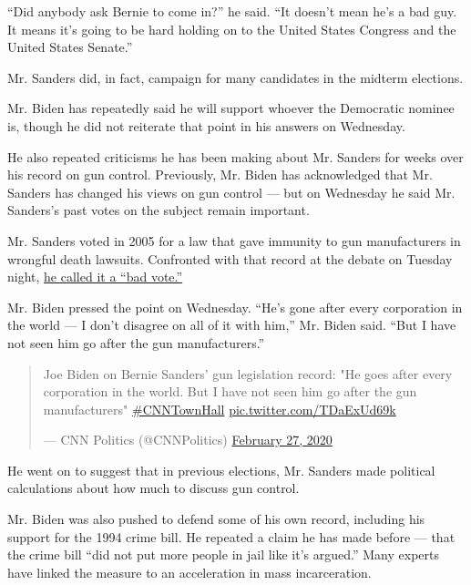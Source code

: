 ``Did anybody ask Bernie to come in?'' he said. ``It doesn't mean he's a
bad guy. It means it's going to be hard holding on to the United States
Congress and the United States Senate.''

Mr. Sanders did, in fact, campaign for many candidates in the midterm
elections.

Mr. Biden has repeatedly said he will support whoever the Democratic
nominee is, though he did not reiterate that point in his answers on
Wednesday.

He also repeated criticisms he has been making about Mr. Sanders for
weeks over his record on gun control. Previously, Mr. Biden has
acknowledged that Mr. Sanders has changed his views on gun control ---
but on Wednesday he said Mr. Sanders's past votes on the subject remain
important.

Mr. Sanders voted in 2005 for a law that gave immunity to gun
manufacturers in wrongful death lawsuits. Confronted with that record at
the debate on Tuesday night,
\href{https://www.nytimes3xbfgragh.onion/2020/02/25/us/politics/bernie-sanders-brady-bill-guns.html}{he
called it a ``bad vote.''}

Mr. Biden pressed the point on Wednesday. ``He's gone after every
corporation in the world --- I don't disagree on all of it with him,''
Mr. Biden said. ``But I have not seen him go after the gun
manufacturers.''

\begin{quote}
Joe Biden on Bernie Sanders' gun legislation record: "He goes after
every corporation in the world. But I have not seen him go after the gun
manufacturers"
\href{https://twitter.com/hashtag/CNNTownHall?src=hash\&ref_src=twsrc\%5Etfw}{\#CNNTownHall}
\href{https://t.co/TDaExUd69k}{pic.twitter.com/TDaExUd69k}

--- CNN Politics (@CNNPolitics)
\href{https://twitter.com/CNNPolitics/status/1232837394132611072?ref_src=twsrc\%5Etfw}{February
27, 2020}
\end{quote}

He went on to suggest that in previous elections, Mr. Sanders made
political calculations about how much to discuss gun control.

Mr. Biden was also pushed to defend some of his own record, including
his support for the 1994 crime bill. He repeated a claim he has made
before --- that the crime bill ``did not put more people in jail like
it's argued.'' Many experts have linked the measure to an acceleration
in mass incarceration.

